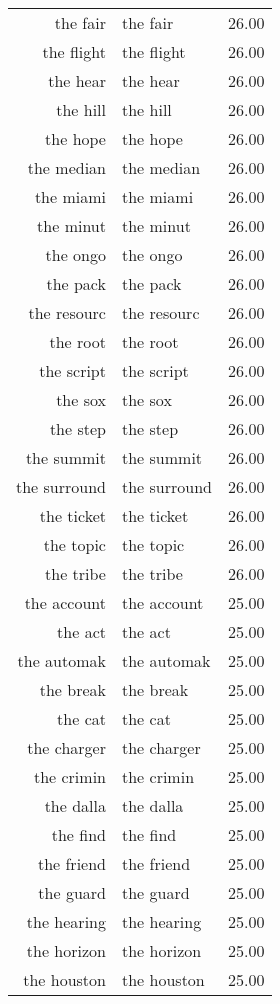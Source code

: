 \begin{table}[ht]
\begin{tabular}{rlr}
  the fair & the fair & 26.00 \\ 
  the flight & the flight & 26.00 \\ 
  the hear & the hear & 26.00 \\ 
  the hill & the hill & 26.00 \\ 
  the hope & the hope & 26.00 \\ 
  the median & the median & 26.00 \\ 
  the miami & the miami & 26.00 \\ 
  the minut & the minut & 26.00 \\ 
  the ongo & the ongo & 26.00 \\ 
  the pack & the pack & 26.00 \\ 
  the resourc & the resourc & 26.00 \\ 
  the root & the root & 26.00 \\ 
  the script & the script & 26.00 \\ 
  the sox & the sox & 26.00 \\ 
  the step & the step & 26.00 \\ 
  the summit & the summit & 26.00 \\ 
  the surround & the surround & 26.00 \\ 
  the ticket & the ticket & 26.00 \\ 
  the topic & the topic & 26.00 \\ 
  the tribe & the tribe & 26.00 \\ 
  the account & the account & 25.00 \\ 
  the act & the act & 25.00 \\ 
  the automak & the automak & 25.00 \\ 
  the break & the break & 25.00 \\ 
  the cat & the cat & 25.00 \\ 
  the charger & the charger & 25.00 \\ 
  the crimin & the crimin & 25.00 \\ 
  the dalla & the dalla & 25.00 \\ 
  the find & the find & 25.00 \\ 
  the friend & the friend & 25.00 \\ 
  the guard & the guard & 25.00 \\ 
  the hearing & the hearing & 25.00 \\ 
  the horizon & the horizon & 25.00 \\ 
  the houston & the houston & 25.00 \\ 

\end{tabular}
\end{table}
